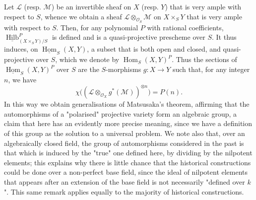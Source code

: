 \begin{enumerate}[label=\alph*.]
        Let $\mathcal{L}$ (resp. $\mathcal{M}$) be an invertible sheaf on $X$ (resp. $Y$) that is very ample with respect to $S$, whence we obtain a sheaf $\mathcal{L}\otimes_{\mathcal{O}_S}\mathcal{M}$ on $X\times_S Y$ that is very ample with respect to $S$.
        Then, for any polynomial $P$ with rational coefficients, $\underline{\operatorname{Hilb}}_{(X\times_S Y)/S}^P$ is defined and is a quasi-projective prescheme over $S$.
        It thus induces, on $\underline{\operatorname{Hom}}_S(X,Y)$, a subset that is both open and closed, and quasi-projective over $S$, which we denote by $\operatorname{Hom}_S(X,Y)^P$.
        Thus the sections of $\underline{\operatorname{Hom}}_S(X,Y)^P$ over $S$ are the $S$-morphisms $g\colon X\to Y$ such that, for any integer $n$, we have
        \[
          \chi\Big((\mathcal{L}\otimes_{\mathcal{O}_X}g^*(\mathcal{M}))^{\otimes n}\Big)
          = P(n).
        \]
        In this way we obtain generalisations of Matsusaka's theorem, affirming that the automorphisms of a "polarised" projective variety form an algebraic group, a claim that here has an evidently more precise meaning, since we have a definition of this group as the solution to a universal problem.
        We note also that, over an algebraically closed field, the group of automorphisms considered in the past is that which is induced by the "true" one defined here, by dividing by the nilpotent elements;
        this explains why there is little chance that the historical constructions could be done over a non-perfect base field, since the ideal of nilpotent elements that appears after an extension of the base field is not necessarily "defined over $k$".
        This same remark applies equally to the majority of historical constructions.
\end{enumerate}
